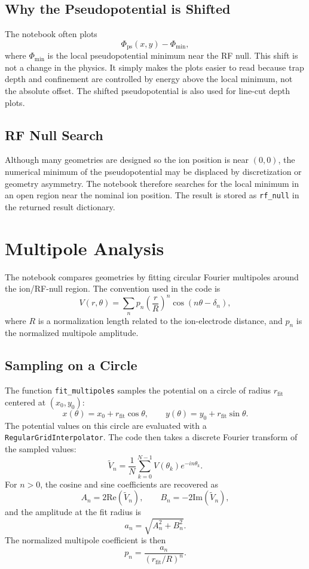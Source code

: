 \documentclass[11pt]{article}
\begin{document}
\subsection{Why the Pseudopotential is Shifted}

The notebook often plots
\[
  \Phi_{\mathrm{ps}}(x,y) - \Phi_{\min},
\]
where \(\Phi_{\min}\) is the local pseudopotential minimum near the RF null.
This shift is not a change in the physics. It simply makes the plots easier to
read because trap depth and confinement are controlled by energy above the
local minimum, not the absolute offset. The shifted pseudopotential is also
used for line-cut depth plots.

\subsection{RF Null Search}

Although many geometries are designed so the ion position is near \((0,0)\),
the numerical minimum of the pseudopotential may be displaced by discretization
or geometry asymmetry. The notebook therefore searches for the local minimum in
an open region near the nominal ion position. The result is stored as
\texttt{rf\_null} in the returned result dictionary.

\newpage

\section{Multipole Analysis}

The notebook compares geometries by fitting circular Fourier multipoles around
the ion/RF-null region. The convention used in the code is
\[
  V(r,\theta)
  =
  \sum_n p_n
  \left(\frac{r}{R}\right)^n
  \cos(n\theta-\delta_n),
\]
where \(R\) is a normalization length related to the ion-electrode distance,
and \(p_n\) is the normalized multipole amplitude.

\subsection{Sampling on a Circle}

The function \texttt{fit\_multipoles} samples the potential on a circle of
radius \(r_{\mathrm{fit}}\) centered at \((x_0,y_0)\):
\[
  x(\theta)=x_0+r_{\mathrm{fit}}\cos\theta,
  \qquad
  y(\theta)=y_0+r_{\mathrm{fit}}\sin\theta.
\]
The potential values on this circle are evaluated with a
\texttt{RegularGridInterpolator}. The code then takes a discrete Fourier
transform of the sampled values:
\[
  \tilde{V}_n = \frac{1}{N}\sum_{k=0}^{N-1} V(\theta_k)e^{-in\theta_k}.
\]
For \(n>0\), the cosine and sine coefficients are recovered as
\[
  A_n = 2\mathrm{Re}(\tilde{V}_n), \qquad
  B_n = -2\mathrm{Im}(\tilde{V}_n),
\]
and the amplitude at the fit radius is
\[
  a_n = \sqrt{A_n^2+B_n^2}.
\]
The normalized multipole coefficient is then
\[
  p_n = \frac{a_n}{(r_{\mathrm{fit}}/R)^n}.
\]
\end{document}
